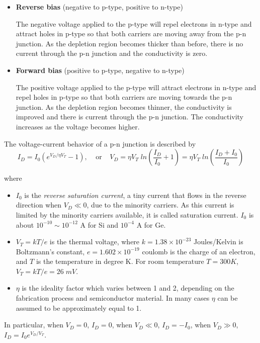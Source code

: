 \begin{itemize}
\item {\bf Reverse bias} (negative to p-type, positive to n-type)

  The negative voltage applied to the p-type will repel electrons in n-type
  and attract holes in p-type so that both carriers are moving away from 
  the p-n junction. As the depletion region becomes thicker than before, 
  there is no current through the p-n junction and the conductivity is zero.

\item {\bf Forward bias} (positive to p-type, negative to n-type)

  The positive voltage applied to the p-type will attract electrons in n-type
  and repel holes in p-type so that both carriers are moving towards the p-n
  junction. As the depletion region becomes thinner, the conductivity is 
  improved and there is current through the p-n junction. The conductivity
  increases as the voltage becomes higher.
  
\end{itemize}
The voltage-current behavior of a p-n junction is described by
\[ I_D=I_0 ( e^{V_D/\eta V_T}-1 ), \;\;\;\;\mbox{or}\;\;\;\;
	V_D=\eta V_T\;ln (\frac{I_D}{I_0}+1)=\eta V_T\;ln (\frac{I_D+I_0}{I_0})	\]

where 
\begin{itemize}
\item $I_0$ is the {\em reverse saturation current}, a tiny current that 
  flows in the reverse direction when $V_D \ll 0$, due to the minority 
  carriers. As this current is limited by the minority carriers available,
  it is called saturation current. $I_0$ is about $10^{-10} \sim 10^{-12}$ 
  A for Si and $10^{-4}$ A for Ge.
\item $ V_T=kT/e $ is the thermal voltage, where 
  $k=1.38\times 10^{-23}$ Joules/Kelvin is Boltzmann's constant, 
  $e=1.602\times 10^{-19}$ coulomb is the charge of an electron, and
  $T$ is the temperature in degree K. For room temperature $T=300K$, 
  $V_T=kT/e=26\; mV$.
\item $\eta$ is the ideality factor which varies between 1 and 2, depending
  on the fabrication process and semiconductor material. In many cases $\eta$
  can be assumed to be approximately equal to 1.
\end{itemize}
In particular, when $V_D=0$, $I_D=0$, when $V_D\ll 0$, $I_D=-I_0$, when
$V_D\gg 0$, $I_D=I_0 e^{V_D/V_T}$.


